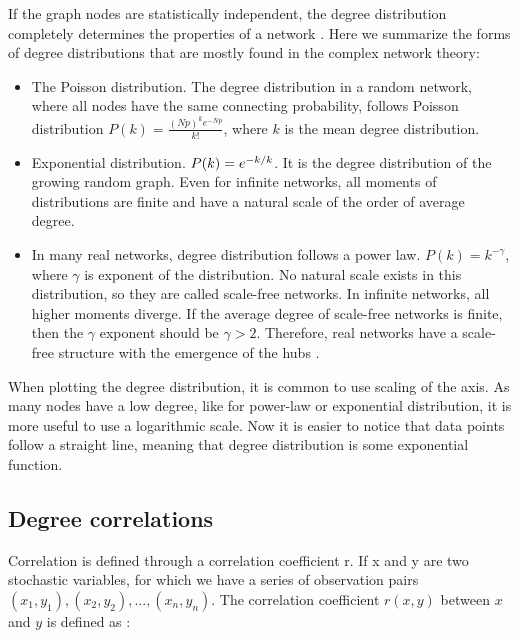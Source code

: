If the graph nodes are statistically independent, the degree distribution completely determines the properties of a network \cite{dorogovtsev2002evolution}.%
Here we summarize the forms of degree distributions that are mostly found in the complex network theory:
\begin{itemize}
	\item The Poisson distribution. The degree distribution in a random network, where all nodes have the same connecting probability, follows Poisson distribution $P(k)= \frac{(Np)^ke^{-Np}}{k!}$, where $k$ is the mean degree distribution. 
	
	\item Exponential distribution. $P(k) = e^{-k/ \- k}$. It is the degree distribution of the growing random graph. Even for infinite networks, all moments of distributions are finite and have a natural scale of the order of average degree.
	
	\item In many real networks, degree distribution follows a power law. $P(k) = k ^ {-\gamma} $, where $\gamma$ is exponent of the distribution. No natural scale exists in this distribution, so they are called scale-free networks. In infinite networks, all higher moments diverge. If the average degree of scale-free networks is finite, then the $\gamma$ exponent should be $\gamma>2$. Therefore, real networks have a scale-free structure with the emergence of the hubs \cite{newman2010}. 
\end{itemize}

When plotting the degree distribution, it is common to use scaling of the axis. As many nodes have a low degree, like for power-law or exponential distribution, it is more useful to use a logarithmic scale. Now it is easier to notice that data points follow a straight line, meaning that degree distribution is some exponential function. 

\subsection{Degree correlations} %

Correlation is defined through a correlation coefficient r. If x and y are two stochastic variables, for which we have a series of observation pairs $(x_1, y_1), (x_2, y_2), ...,(x_n, y_n)$. The correlation coefficient $r(x, y)$ between $x$ and $y$ is defined as \cite{van2010graph}:

